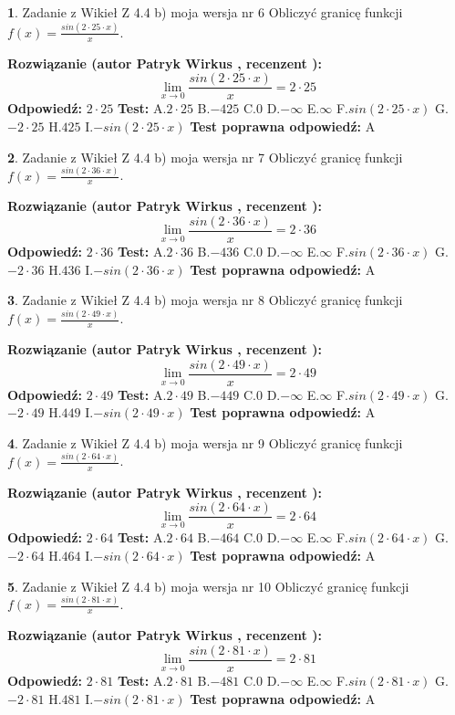 \documentclass[12pt, a4paper]{article}
\theoremstyle{definition} %
\newtheorem{zad}{}
\newcommand{\zadStart}[1]{\begin{zad}#1\newline}
\newcommand{\zadStop}{\end{zad}}
\newcommand{\rozwStart}[2]{\noindent \textbf{Rozwiązanie (autor #1 , recenzent #2): }\newline}
\newcommand{\rozwStop}{\newline}
\newcommand{\odpStart}{\noindent \textbf{Odpowiedź:}\newline}
\newcommand{\odpStop}{\newline}
\newcommand{\testStart}{\noindent \textbf{Test:}\newline}
\newcommand{\testStop}{\newline}
\newcommand{\kluczStart}{\noindent \textbf{Test poprawna odpowiedź:}\newline}
\newcommand{\kluczStop}{\newline}
\begin{document}
\zadStart{Zadanie z Wikieł Z 4.4 b) moja wersja nr 6}
Obliczyć granicę funkcji $f(x)=\frac{sin(2 \cdot25\cdot x)}{x}$.
\zadStop
\rozwStart{Patryk Wirkus}{}
$$\lim\limits_{x\to 0}\frac{sin(2 \cdot 25\cdot x)}{x}=
2 \cdot 25$$
\rozwStop
\odpStart
$2 \cdot 25$
\odpStop
\testStart
A.$2 \cdot 25$
B.$-425$
C.$0$
D.$-\infty$
E.$\infty$
F.$sin(2 \cdot 25\cdot x)$
G.$-2 \cdot 25$
H.$425$
I.$-sin(2 \cdot 25\cdot x)$
\testStop
\kluczStart
A
\kluczStop



\zadStart{Zadanie z Wikieł Z 4.4 b) moja wersja nr 7}
Obliczyć granicę funkcji $f(x)=\frac{sin(2 \cdot36\cdot x)}{x}$.
\zadStop
\rozwStart{Patryk Wirkus}{}
$$\lim\limits_{x\to 0}\frac{sin(2 \cdot 36\cdot x)}{x}=
2 \cdot 36$$
\rozwStop
\odpStart
$2 \cdot 36$
\odpStop
\testStart
A.$2 \cdot 36$
B.$-436$
C.$0$
D.$-\infty$
E.$\infty$
F.$sin(2 \cdot 36\cdot x)$
G.$-2 \cdot 36$
H.$436$
I.$-sin(2 \cdot 36\cdot x)$
\testStop
\kluczStart
A
\kluczStop



\zadStart{Zadanie z Wikieł Z 4.4 b) moja wersja nr 8}
Obliczyć granicę funkcji $f(x)=\frac{sin(2 \cdot49\cdot x)}{x}$.
\zadStop
\rozwStart{Patryk Wirkus}{}
$$\lim\limits_{x\to 0}\frac{sin(2 \cdot 49\cdot x)}{x}=
2 \cdot 49$$
\rozwStop
\odpStart
$2 \cdot 49$
\odpStop
\testStart
A.$2 \cdot 49$
B.$-449$
C.$0$
D.$-\infty$
E.$\infty$
F.$sin(2 \cdot 49\cdot x)$
G.$-2 \cdot 49$
H.$449$
I.$-sin(2 \cdot 49\cdot x)$
\testStop
\kluczStart
A
\kluczStop



\zadStart{Zadanie z Wikieł Z 4.4 b) moja wersja nr 9}
Obliczyć granicę funkcji $f(x)=\frac{sin(2 \cdot64\cdot x)}{x}$.
\zadStop
\rozwStart{Patryk Wirkus}{}
$$\lim\limits_{x\to 0}\frac{sin(2 \cdot 64\cdot x)}{x}=
2 \cdot 64$$
\rozwStop
\odpStart
$2 \cdot 64$
\odpStop
\testStart
A.$2 \cdot 64$
B.$-464$
C.$0$
D.$-\infty$
E.$\infty$
F.$sin(2 \cdot 64\cdot x)$
G.$-2 \cdot 64$
H.$464$
I.$-sin(2 \cdot 64\cdot x)$
\testStop
\kluczStart
A
\kluczStop



\zadStart{Zadanie z Wikieł Z 4.4 b) moja wersja nr 10}
Obliczyć granicę funkcji $f(x)=\frac{sin(2 \cdot81\cdot x)}{x}$.
\zadStop
\rozwStart{Patryk Wirkus}{}
$$\lim\limits_{x\to 0}\frac{sin(2 \cdot 81\cdot x)}{x}=
2 \cdot 81$$
\rozwStop
\odpStart
$2 \cdot 81$
\odpStop
\testStart
A.$2 \cdot 81$
B.$-481$
C.$0$
D.$-\infty$
E.$\infty$
F.$sin(2 \cdot 81\cdot x)$
G.$-2 \cdot 81$
H.$481$
I.$-sin(2 \cdot 81\cdot x)$
\testStop
\kluczStart
A
\kluczStop
\end{document}
